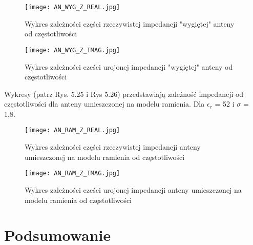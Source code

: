 \begin{figure}[h!]
\centering
	\texttt{[image: AN\_WYG\_Z\_REAL.jpg]}
	\caption{Wykres zależności części rzeczywistej impedancji "wygiętej" anteny  od częstotliwości}
\end{figure}

\newpage
\begin{figure}[h!]
\centering
	\texttt{[image: AN\_WYG\_Z\_IMAG.jpg]}
	\caption{Wykres zależności cześci urojonej impedancji "wygiętej" anteny od częstotliwości}
\end{figure}



\newpage
Wykresy (patrz Rys. 5.25 i Rys 5.26) przedstawiają zależność impedancji od częstotliwości dla anteny umieszczonej na modelu ramienia. Dla \cite{Artykul_1} $\epsilon_{r}$ = 52 i $\sigma$ = 1,8.
\begin{figure}[h!]
\centering
	\texttt{[image: AN\_RAM\_Z\_REAL.jpg]}
	\caption{Wykres zależności części rzeczywistej impedancji anteny umieszczonej na modelu ramienia od częstotliwości}
\end{figure}


\newpage
\begin{figure}[h!]
\centering
	\texttt{[image: AN\_RAM\_Z\_IMAG.jpg]}
	\caption{Wykres zależności cześci urojonej impedancji anteny umieszczonej na modelu ramienia od częstotliwości}
\end{figure}


\chapter{Podsumowanie}

